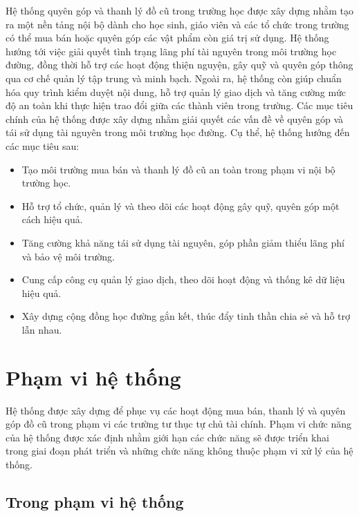 \documentclass[12pt,a4paper]{report}
\begin{document}
Hệ thống quyên góp và thanh lý đồ cũ trong trường học được xây
dựng nhằm tạo ra một nền tảng nội bộ dành cho học sinh, giáo viên và các tổ chức
trong trường có thể mua bán hoặc quyên góp các vật phẩm còn giá trị sử
dụng. Hệ thống hướng tới việc giải quyết tình trạng lãng phí tài nguyên trong môi
trường học đường, đồng thời hỗ trợ các hoạt động thiện nguyện, gây quỹ và quyên
góp thông qua cơ chế quản lý tập trung và minh bạch. Ngoài ra, hệ thống còn giúp
chuẩn hóa quy trình kiểm duyệt nội dung, hỗ trợ quản lý giao dịch và tăng cường
mức độ an toàn khi thực hiện trao đổi giữa các thành viên trong trường. Các mục
tiêu chính của hệ thống được xây dựng nhằm giải quyết các vấn đề về 
quyên góp và tái sử dụng tài nguyên trong môi trường học đường. Cụ thể, hệ thống
hướng đến các mục tiêu sau:

\begin{itemize}[label=--, leftmargin=1.2cm]


\item Tạo môi trường mua bán và thanh lý đồ cũ an toàn trong phạm vi nội bộ trường học.

\item Hỗ trợ tổ chức, quản lý và theo dõi các hoạt động gây quỹ, quyên góp một cách hiệu quả.

\item Tăng cường khả năng tái sử dụng tài nguyên, góp phần giảm thiểu lãng phí và bảo vệ môi trường.

\item Cung cấp công cụ quản lý giao dịch, theo dõi hoạt động và thống kê dữ liệu hiệu quả.

\item Xây dựng cộng đồng học đường gắn kết, thúc đẩy tinh thần chia sẻ và hỗ trợ lẫn nhau.


\end{itemize}


\section{Phạm vi hệ thống}

Hệ thống được xây dựng để phục vụ các hoạt động mua bán, thanh
lý và quyên góp đồ cũ trong phạm vi các trường tư thục tự chủ tài chính. Phạm vi
chức năng của hệ thống được xác định nhằm giới hạn các chức năng sẽ được triển
khai trong giai đoạn phát triển và những chức năng không thuộc phạm vi xử lý
của hệ thống.

\subsection{Trong phạm vi hệ thống}
\end{document}
